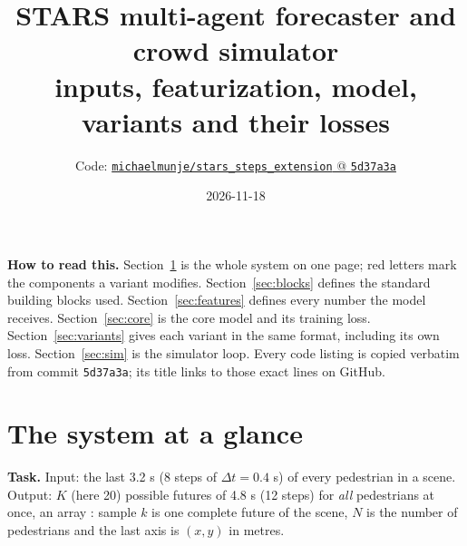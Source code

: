 \documentclass[10pt]{article}
\title{STARS multi-agent forecaster and crowd simulator\\[2pt] \large inputs, featurization, model, variants and their losses}
\author{Code: \href{https://github.com/michaelmunje/stars_steps_extension/tree/5d37a3a459c37f0629b9c0044c9cba02300095fb}{\texttt{michaelmunje/stars\_steps\_extension} @ \texttt{5d37a3a}}}
\date{2026-11-18}
\newcommand{\shape}[1]{{\small\ttfamily [#1]}}
\begin{document}
\maketitle

\noindent\textbf{How to read this.} Section~\ref{sec:overview} is the whole system on one page; red letters
mark the components a variant modifies. Section~\ref{sec:blocks} defines the standard building blocks used.
Section~\ref{sec:features} defines every number the model receives. Section~\ref{sec:core} is the core model and
its training loss. Section~\ref{sec:variants} gives each variant in the same format, including its own loss.
Section~\ref{sec:sim} is the simulator loop. Every code listing is copied verbatim from commit \texttt{5d37a3a};
its title links to those exact lines on GitHub.

\tableofcontents

\section{The system at a glance}\label{sec:overview}
\textbf{Task.} Input: the last 3.2 s (8 steps of $\Delta t=0.4$ s) of every pedestrian in a scene. Output:
$K$ (here 20) possible futures of 4.8 s (12 steps) for \emph{all} pedestrians at once, an array
\shape{K, N, 12, 2}: sample $k$ is one complete future of the scene, $N$ is the number of pedestrians and
the last axis is $(x,y)$ in metres.
\end{document}
